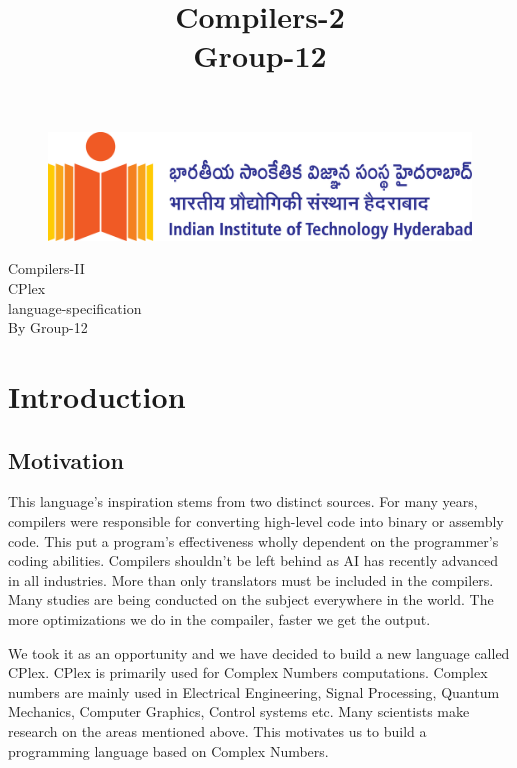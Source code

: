 \documentclass[12pt]{article}
\title{Compilers-2\\Group-12}
\date{}
\begin{document}

\begin{figure}[H]
    \centering 
    \includegraphics[scale=0.1]{./logo.png}
    \label{fig:my_label}
\end{figure}
\vspace{1cm}
\begin{center}
    {\fontsize{35}{30}\selectfont Compilers-II}\\
    \vspace{2cm}
    {\fontsize{35}{30}\selectfont CPlex}\\
    \vspace{0.5cm}
    {\fontsize{25}{30}\selectfont language-specification}\\
    \vspace{1cm}
    {\fontsize{30}{30}\selectfont By Group-12}\\
\end{center}
\pagebreak
\begin{center}
    \tableofcontents
\end{center}
\pagebreak
\section{Introduction}
\subsection{Motivation}
This language's inspiration stems from two distinct sources. For many years, compilers were responsible for converting high-level code into binary or assembly code. This put a program's effectiveness wholly dependent on the programmer's coding abilities. Compilers shouldn't be left behind as AI has recently advanced in all industries. More than only translators must be included in the compilers. Many studies are being conducted on the subject everywhere in the world. The more optimizations we do in the compailer, faster we get the output.

                         We took it as an opportunity and we have decided to build a new language called CPlex. CPlex is primarily used for Complex Numbers computations. Complex numbers are mainly used in Electrical Engineering, Signal Processing, Quantum Mechanics, Computer Graphics, Control systems etc. Many scientists make research on the areas mentioned above. This motivates us to build a programming language based on Complex Numbers.
\end{document}
